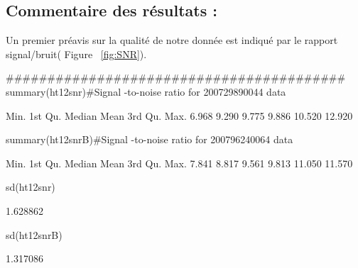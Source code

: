\documentclass[a4paper,10pt]{article}
\begin{document}
\subsection{ Commentaire des résultats :}
Un premier préavis sur la qualité de notre donnée est indiqué par le rapport signal/bruit( Figure ~\ref{fig:SNR}).\\
\begin{Schunk}
\begin{Sinput}
#########################################
 summary(ht12snr)#Signal -to-noise  ratio  for  200729890044  data
\end{Sinput}
\begin{Soutput}
   Min. 1st Qu.  Median    Mean 3rd Qu.    Max. 
  6.968   9.290   9.775   9.886  10.520  12.920 
\end{Soutput}
\begin{Sinput}
 summary(ht12snrB)#Signal -to-noise  ratio  for  200796240064  data
\end{Sinput}
\begin{Soutput}
   Min. 1st Qu.  Median    Mean 3rd Qu.    Max. 
  7.841   8.817   9.561   9.813  11.050  11.570 
\end{Soutput}
\begin{Sinput}
 sd(ht12snr)
\end{Sinput}
\begin{Soutput}
[1] 1.628862
\end{Soutput}
\begin{Sinput}
 sd(ht12snrB)
\end{Sinput}
\begin{Soutput}
[1] 1.317086
\end{Soutput}
\end{Schunk}
\end{document}
